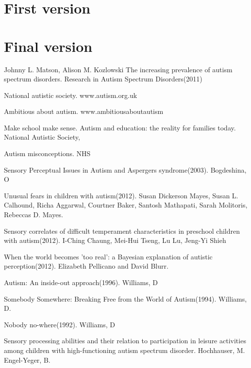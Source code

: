 \documentclass[11pt]{report}
\begin{document}
\chapter{First version}

\chapter{Final version}

\begin{thebibliography}{9}

Johnny L. Matson, Alison M. Kozlowski
The increasing prevalence of autism spectrum disorders. Research in Autism Spectrum Disorders(2011)

National autistic society. www.autism.org.uk

Ambitious about autism. www.ambitiousaboutautism

Make school make sense. Autism and education: the reality for families today. National Autistic Society, 

Autism misconceptions. NHS

Sensory Perceptual Issues in Autism and Aspergers syndrome(2003). Bogdeshina, O

Unusual fears in children with autism(2012). Susan Dickerson Mayes, Susan L. Calhound, Richa Aggarwal, Courtner Baker, Santosh Mathapati, Sarah Molitoris, Rebeccas D. Mayes.

Sensory correlates of difficult temperament characteristics in preschool children with autism(2012). I-Ching Chaung, Mei-Hui Tseng, Lu Lu, Jeng-Yi Shieh

When the world becomes 'too real': a Bayesian explanation of autistic perception(2012). Elizabeth Pellicano and David Blurr.

Autism: An inside-out approach(1996). Williams, D

Somebody Somewhere: Breaking Free from the World of Autism(1994). Williams, D.

Nobody no-where(1992). Williams, D

Sensory processing abilities and their relation to participation in leisure activities among children with high-functioning autism spectrum disorder. Hochhauser, M. Engel-Yeger, B.


\end{thebibliography}
\end{document}
